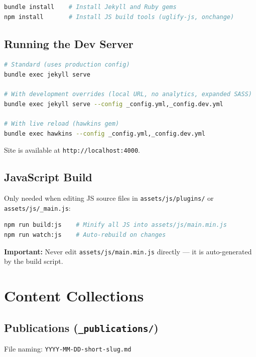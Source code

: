 \documentclass[11pt, a4paper]{article}
\begin{document}
\begin{lstlisting}[language=bash]
bundle install    # Install Jekyll and Ruby gems
npm install       # Install JS build tools (uglify-js, onchange)
\end{lstlisting}

\subsection*{Running the Dev Server}

\begin{lstlisting}[language=bash]
# Standard (uses production config)
bundle exec jekyll serve

# With development overrides (local URL, no analytics, expanded SASS)
bundle exec jekyll serve --config _config.yml,_config.dev.yml

# With live reload (hawkins gem)
bundle exec hawkins --config _config.yml,_config.dev.yml
\end{lstlisting}

Site is available at \texttt{http://localhost:4000}.

\subsection*{JavaScript Build}

Only needed when editing JS source files in \texttt{assets/js/plugins/} or
\texttt{assets/js/\_main.js}:

\begin{lstlisting}[language=bash]
npm run build:js    # Minify all JS into assets/js/main.min.js
npm run watch:js    # Auto-rebuild on changes
\end{lstlisting}

\textbf{Important:} Never edit \texttt{assets/js/main.min.js} directly --- it is
auto-generated by the build script.

\section{Content Collections}

\subsection*{Publications (\texttt{\_publications/})}

File naming: \texttt{YYYY-MM-DD-short-slug.md}
\end{document}

